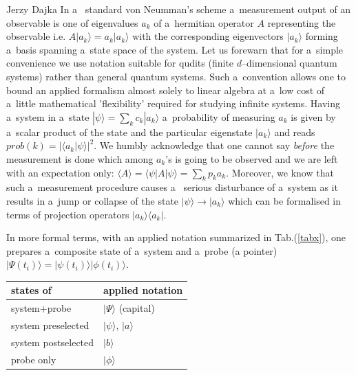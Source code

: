 \begin{artengenv}{Jerzy Dajka}
In a~ standard von Neumman's scheme a~measurement output of an observable   is one of eigenvalues $a_k$ of  a~hermitian operator $A$ representing the observable i.e. $A|a_k\rangle=a_k|a_k\rangle$ with the corresponding eigenvectors  $|a_k\rangle$ forming a~basis spanning a~state space of the system. Let us forewarn that for a~simple convenience we use notation suitable for qudits (finite $d$--dimensional quantum systems) rather than general quantum systems. Such a~convention allows one to bound an applied formalism almost solely to linear algebra at a~low cost of a~little  mathematical 'flexibility' required for studying infinite systems.  Having a~system in a~state $|\psi\rangle=\sum_k c_k |a_k\rangle$ a~probability of measuring $a_k$ is given by a~scalar product of the state and the particular eigenstate  $|a_k\rangle$ and reads  $prob(k)=|\langle a_k|\psi\rangle|^2$. We humbly acknowledge that one cannot say {\it before} the measurement is done which among $a_k$'s is going to be  observed and we are left with an expectation only:   $\langle A\rangle =\langle\psi| A|\psi\rangle=\sum_k p_k a_k$. Moreover, we know that such a~measurement procedure
     causes a~ serious disturbance of a~system as it results in  a~jump or collapse of the state $|\psi\rangle\rightarrow|a_k\rangle$ which can be formalised in terms of projection operators $|a_k\rangle\langle a_k|$. 



In more formal terms, with an applied notation summarized in Tab.(\ref{tabx}), one prepares a~composite state of a~system and a~probe (a pointer) 
  $|\Psi(t_i)\rangle=|\psi(t_i)\rangle|\phi(t_i)\rangle$. 
\begin{table}[ht]
\centering
\begin{tabular}{|l||l|}
\hline
states of  &applied  notation \\
\hline
\hline
system+probe & $|\Psi\rangle$ (capital)\\
system preselected& $|\psi\rangle$, $|a\rangle$ \\
system postselected& $|b\rangle$ \\
probe only& $|\phi\rangle$\\
\hline


\end{tabular}
\end{table}
\end{artengenv}
